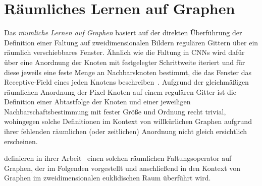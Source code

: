 \chapter{Räumliches Lernen auf Graphen}
\label{raeumliches_lernen}

Das \emph{räumliche Lernen auf Graphen} basiert auf der direkten Überführung der Definition einer Faltung auf zweidimensionalen Bildern \bzw{} regulären Gittern über ein räumlich verschiebbares Fenster.
Ähnlich wie die Faltung in \glspl{CNN} wird dafür über eine Anordnung der Knoten mit festgelegter Schrittweite iteriert und für diese jeweils eine feste Menge an Nachbarsknoten bestimmt, die das Fenster \bzw{} das Receptive-Field eines jeden Knotens beschreiben~\cite{patchy}.
Aufgrund der gleichmäßigen räumlichen Anordnung der Pixel \bzw{} Knoten auf einem regulären Gitter ist die Definition einer Abtastfolge der Knoten und einer jeweiligen Nachbarschaftsbestimmung mit fester Größe und Ordnung recht trivial, wohingegen solche Definitionen im Kontext von willkürlichen Graphen aufgrund ihrer \ggf{} fehlenden räumlichen (oder zeitlichen) Anordnung nicht gleich ersichtlich erscheinen.

\citeauthor{patchy} definieren in ihrer Arbeit~\cite{patchy} einen solchen räumlichen Faltungsoperator auf Graphen, der im Folgenden vorgestellt und anschließend in den Kontext von Graphen im zweidimensionalen euklidischen Raum überführt wird.





